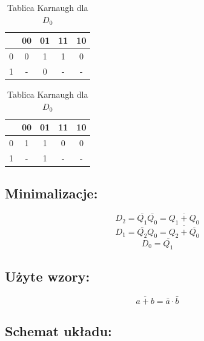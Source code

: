 \documentclass[12pt,a4paper]{article}
\begin{document}
\begin{table}[H]
\begin{minipage}{.5\textwidth}
					\caption{Tablica Karnaugh dla $D_1$}
					\vspace{0.2cm}
					\centering
					\begin{tabular}{c|c|c|c|c}
						\backslashbox{$Q_2$}{$Q_1Q_0$}&00&01&11&10\\\hline
						0&	0&1&1&0\\\hline
						1&	-&0&-&-\\
					\end{tabular}
				\end{minipage}%
				\begin{minipage}{.5\textwidth}
					\caption{Tablica Karnaugh dla $D_0$}
					\vspace{0.2cm}
					\centering
					\begin{tabular}{c|c|c|c|c}
						\backslashbox{$Q_2$}{$Q_1Q_0$}&00&01&11&10\\\hline
						0&	1&1&0&0\\\hline
						1&	-&1&-&-\\
					\end{tabular} 
					
				\end{minipage}
			\end{table}
	
		\subsection{Minimalizacje:}
			
			\begin{displaymath}
			D_2 = \bar{Q_1}\bar{Q_0} = \overline{Q_1 + Q_0}
			\end{displaymath}
			\begin{displaymath}
			D_1 = \bar{Q_2}Q_0 = \overline{Q_2 + \overline{Q_0}}
			\end{displaymath}
			\begin{displaymath}
			D_0 = \bar{Q_1}
			\end{displaymath}
			
		\subsection{Użyte wzory:}
		
			\begin{equation}
			\overline{a+b}=\bar{a}\cdot\bar{b}
			\end{equation}
			
		\subsection{Schemat układu:}
		
\end{document}
